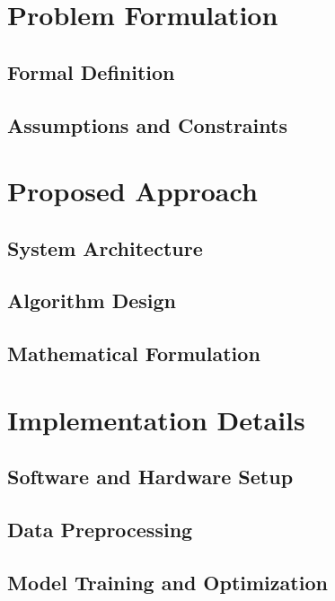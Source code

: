\section{Problem Formulation}
\label{sec:problem-formulation}

    \subsection{Formal Definition}
    \label{subsec:formal-definition}

    \subsection{Assumptions and Constraints}
    \label{subsec:assumptions}


\section{Proposed Approach}
\label{sec:proposed-approach}

    \subsection{System Architecture}
    \label{subsec:architecture}

    \subsection{Algorithm Design}
    \label{subsec:algorithm}

    \subsection{Mathematical Formulation}
    \label{subsec:math-formulation}

\section{Implementation Details}
\label{sec:implementation}

    \subsection{Software and Hardware Setup}
    \label{subsec:setup}

    \subsection{Data Preprocessing}
    \label{subsec:preprocessing}

    \subsection{Model Training and Optimization}
    \label{subsec:training}